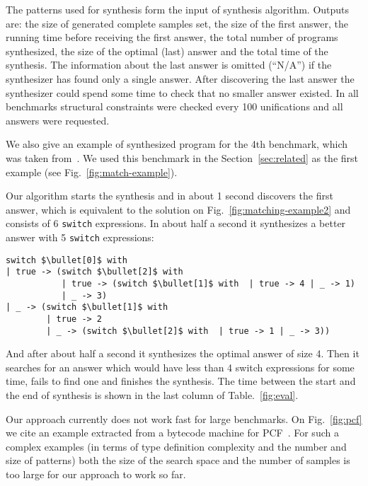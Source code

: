 The patterns used for synthesis form the input of synthesis algorithm.
Outputs are: the size of generated complete samples set, the size of the first answer, the running time before receiving the
first answer, the total number of programs synthesized, the size of the optimal (last) answer and the total time of the synthesis.
The information about the last answer is omitted (``N/A'') if the synthesizer has found only a single answer. After discovering
the last answer
the synthesizer could spend some time to check that no smaller answer existed.
In all benchmarks structural constraints were checked every 100 unifications and all answers were requested.

We also give an example of synthesized program for the 4th benchmark, which was taken from~\cite{maranget2008}. We used this benchmark in the Section~\ref{sec:related} as the first example (see Fig.~\ref{fig:match-example}).

Our algorithm starts the
synthesis and in about 1 second discovers the first answer, which is equivalent to the solution on Fig.~\ref{fig:matching-example2} and
consists of 6 \lstinline|switch| expressions. In about half a second it synthesizes a better answer with 5 \lstinline|switch| expressions:

\begin{lstlisting}
switch $\bullet[0]$ with
| true -> (switch $\bullet[2]$ with  
           | true -> (switch $\bullet[1]$ with  | true -> 4 | _ -> 1)
           | _ -> 3)
| _ -> (switch $\bullet[1]$ with  
        | true -> 2
        | _ -> (switch $\bullet[2]$ with  | true -> 1 | _ -> 3))
\end{lstlisting}

And after about half a second it synthesizes the optimal answer of size 4. Then it searches for an answer which would have less than 4 switch expressions
for some time, fails to find one and finishes the synthesis. 
The time between the start and the end of synthesis is shown in the last column of Table.~\ref{fig:eval}.

Our approach currently does not work fast for large benchmarks. On Fig.~\ref{fig:pcf} we cite an example extracted from a bytecode
machine for PCF~\cite{maranget2008,Plotkin1977LCFCA}. For such a complex examples (in terms of type definition complexity and the number and size of patterns)
both the size of the search space and the number of samples is too large for our approach to work so far.

